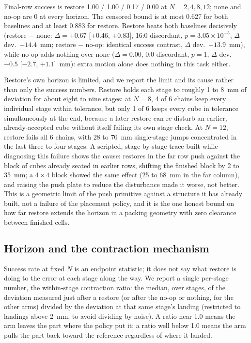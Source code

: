 \documentclass[11pt]{article}
\begin{document}
Final-row success is restore 1.00 / 1.00 / 0.17 / 0.00 at $N=2,4,8,12$;
none and no-op are 0 at every horizon. The censored bound is at most 0.627
for both baselines and at least 0.883 for restore. Restore beats both
baselines decisively (restore $-$ none: $\Delta = +0.67$ [+0.46, +0.83],
16:0 discordant, $p = 3.05\times10^{-5}$, $\Delta$ dev.\ $-14.4$~mm;
restore $-$ no-op: identical success contrast, $\Delta$ dev.\ $-13.9$~mm),
while no-op adds nothing over none ($\Delta = 0.00$, 0:0 discordant, $p=1$,
$\Delta$ dev.\ $-0.5$ [$-2.7$, $+1.1$]~mm): extra motion alone does nothing
in this task either.

Restore's own horizon is limited, and we report the limit and its cause
rather than only the success numbers. Restore holds each stage to roughly 1
to 8~mm of deviation for about eight to nine stages: at $N=8$, 4 of 6
chains keep every individual stage within tolerance, but only 1 of 6 keeps
every cube in tolerance simultaneously at the end, because a later restore
can re-disturb an earlier, already-accepted cube without itself failing its
own stage check. At $N=12$, restore fails all 6 chains, with 28 to 70~mm
single-stage jumps concentrated in the last three to four stages. A
scripted, stage-by-stage trace built while diagnosing this failure shows
the cause: restores in the far row push against the block of cubes already
seated in earlier rows, shifting the finished block by 2 to 35~mm; a
$4\times4$ block showed the same effect (25 to 68~mm in the far column),
and raising the push plate to reduce the disturbance made it worse, not
better. This is a geometric limit of the push primitive against a structure
it has already built, not a failure of the placement policy, and it is the
one honest bound on how far restore extends the horizon in a packing
geometry with zero clearance between finished cells.

\subsection{Horizon and the contraction mechanism}
\label{sec:horizon}
Success rate at fixed $N$ is an endpoint statistic; it does not say what
restore is doing to the error at each stage along the way. We report a
single per-stage number, the within-stage contraction ratio: the median,
over stages, of the deviation measured just after a restore (or after the
no-op or nothing, for the other arms) divided by the deviation at that same
stage's landing (restricted to landings above 2~mm, to avoid dividing by
noise). A ratio near 1.0 means the arm leaves the part where the policy put
it; a ratio well below 1.0 means the arm pulls the part back toward the
reference regardless of where it landed.
\end{document}

